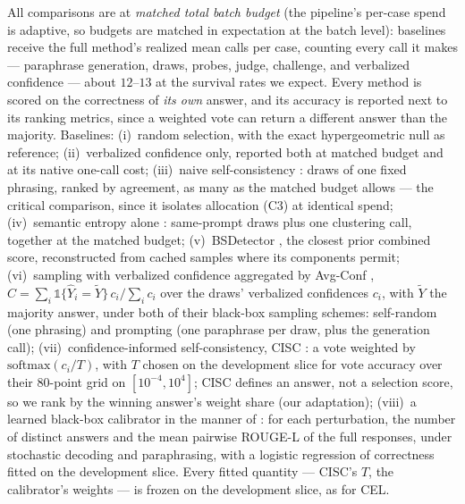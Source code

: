 \documentclass[11pt]{article}
\begin{document}
All comparisons are at \emph{matched total batch budget} (the
pipeline's per-case spend is adaptive, so budgets are matched in
expectation at the batch level): baselines receive the full method's
realized mean calls per case, counting every call it makes ---
paraphrase generation, draws, probes, judge, challenge, and verbalized
confidence --- about $12$--$13$ at the survival rates we expect. Every
method is scored on the correctness of \emph{its own} answer, and its
accuracy is reported next to its ranking metrics, since a weighted vote
can return a different answer than the majority. Baselines:
(i)~random selection, with the exact hypergeometric null as reference;
(ii)~verbalized confidence only, reported both at matched budget and at
its native one-call cost; (iii)~naive self-consistency
\citep{wang2022}: draws of one fixed phrasing, ranked by agreement,
as many as the matched budget allows --- the critical comparison,
since it isolates allocation (C3) at identical spend; (iv)~semantic
entropy alone \citep{kuhn2023}: same-prompt draws plus one clustering
call, together at the matched budget;
(v)~BSDetector \citep{chen2024}, the closest prior combined score,
reconstructed from cached samples where its components permit;
(vi)~sampling with verbalized confidence aggregated by Avg-Conf
\citep{xiong2023}, $C = \sum_i \mathbb{1}\{\hat Y_i = \tilde Y\}\,c_i /
\sum_i c_i$ over the draws' verbalized confidences $c_i$, with
$\tilde Y$ the majority answer, under both of their black-box sampling
schemes: self-random (one phrasing) and prompting (one paraphrase per
draw, plus the generation call);
(vii)~confidence-informed self-consistency, CISC
\citep{taubenfeld2025}: a vote weighted by
$\mathrm{softmax}(c_i/T)$, with $T$ chosen on the development slice
for vote accuracy over their $80$-point grid on $[10^{-4}, 10^{4}]$;
CISC defines an answer, not a selection score, so we rank by the
winning answer's weight share (our adaptation);
(viii)~a learned black-box calibrator in the manner of
\citet{pedapati2024}: for each perturbation, the number of distinct
answers and the mean pairwise ROUGE-L of the full responses, under
stochastic decoding and paraphrasing, with a logistic regression of
correctness fitted on the development slice. Every fitted quantity ---
CISC's $T$, the calibrator's weights --- is frozen on the development
slice, as for CEL.
\end{document}
